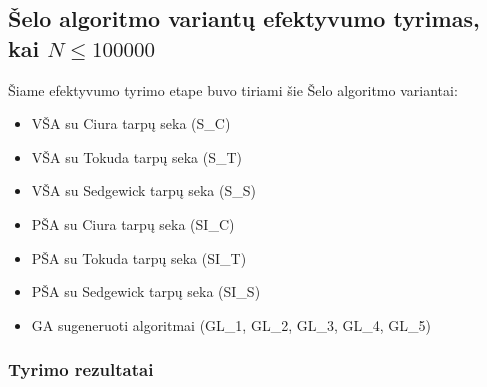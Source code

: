 \documentclass{VUMIFInfKursinis}
\begin{document}
\subsection{Šelo algoritmo variantų efektyvumo tyrimas, kai $N \leq 100000$}

Šiame efektyvumo tyrimo etape buvo tiriami šie Šelo algoritmo variantai:
\begin{itemize}
  \item VŠA su Ciura tarpų seka (S\_C)
  \item VŠA su Tokuda tarpų seka (S\_T)
  \item VŠA su Sedgewick tarpų seka (S\_S)
  \item PŠA su Ciura tarpų seka (SI\_C)
  \item PŠA su Tokuda tarpų seka (SI\_T)
  \item PŠA su Sedgewick tarpų seka (SI\_S)
  \item GA sugeneruoti algoritmai (GL\_1, GL\_2, GL\_3, GL\_4, GL\_5)
\end{itemize}

\subsubsection{Tyrimo rezultatai}
\end{document}
